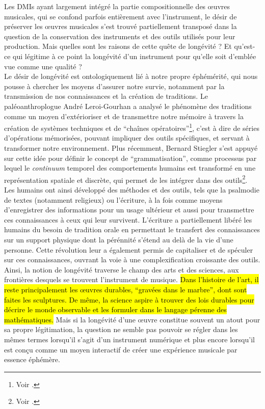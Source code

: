 \indent Les \glspl{DMI} ayant largement intégré la partie compositionnelle des œuvres musicales, qui se confond parfois entièrement avec l'instrument, le désir de préserver les œuvres musicales s'est trouvé partiellement transposé dans la question de la conservation des instruments et des outils utilisés pour leur production. Mais quelles sont les raisons de cette quête de longévité ? Et qu’est-ce qui légitime à ce point la longévité d’un instrument pour qu’elle soit d’emblée vue comme une qualité ?\\
\indent Le désir de longévité est ontologiquement lié à notre propre éphémérité, qui nous pousse à chercher les moyens d'assurer notre survie, notamment par la transmission de nos connaissances et la création de traditions. Le paléoanthroplogue André Leroi-Gourhan a analysé le phénomène des traditions comme un moyen d'extérioriser et de transmettre notre mémoire à travers la création de systèmes techniques et de ``chaînes opératoires''\footnote{Voir \cite{leroi-gourhan_geste_1964}.}, c'est à dire de séries d'opérations mémorisées, pouvant impliquer des outils spécifiques, et servant à transformer notre environnement. Plus récemment, Bernard Stiegler s'est appuyé sur cette idée pour définir le concept de ``grammatisation'', comme processus par lequel le \textit{continuum} temporel des comportements humains est transformé en une représentation spatiale et discrète, qui permet de les intégrer dans des outils\footnote{Voir \cite{stiegler_for_2010}.}.\\
\indent Les humains ont ainsi développé des méthodes et des outils, tels que la psalmodie de textes (notamment religieux) ou l'écriture, à la fois comme moyens d'enregistrer des informations pour un usage ultérieur et aussi pour transmettre ces connaissances à ceux qui leur survivent. L'écriture a partiellement libéré les humains du besoin de tradition orale en permettant le transfert des connaissances sur un support physique dont la pérénnité s'étend au delà de la vie d'une personne. Cette révolution leur a également permis de capitaliser et de spéculer sur ces connaissances, ouvrant la voie à une complexification croissante des outils.\\
\indent Ainsi, la notion de longévité traverse le champ des arts et des sciences, aux frontières desquels se trouvent l'instrument de musique. \hl{Dans l'histoire de l'art, il reste principalement les œuvres durables, ``gravées dans le marbre'', dont sont faites les sculptures. De même, la science aspire à trouver des lois durables pour décrire le monde observable et les formuler dans le langage pérenne des mathématiques.} Mais si la longévité d'une œuvre constitue souvent un atout pour sa propre légitimation, la question ne semble pas pouvoir se régler dans les mêmes termes lorsqu'il s'agit d'un instrument numérique et plus encore lorsqu'il est conçu comme un moyen interactif de créer une expérience musicale par essence éphémère.\\

